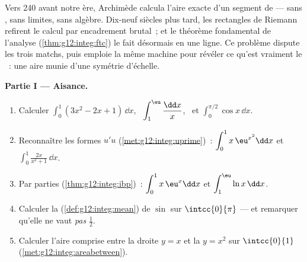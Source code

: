 \begin{problem}
\label{pb:g12:integ:1}
Vers 240 avant notre ère, Archimède calcula l'aire exacte d'un
segment de  --- sans , sans limites, sans
algèbre. Dix-neuf siècles plus tard, les rectangles de Riemann
refirent le calcul par encadrement brutal~; et le théorème
fondamental de l'analyse (\cref{thm:g12:integ:ftc}) le fait
désormais en une ligne. Ce problème dispute les trois matchs, puis
emploie la même machine pour révéler ce qu'est vraiment le
~: une aire munie d'une symétrie d'échelle.

\medskip
\noindent\textbf{Partie I --- Aisance.}
\begin{enumerate}
  \item Calculer $\displaystyle\int_0^1 (3x^2 - 2x + 1)\,\dd x$,
        \ $\displaystyle\int_1^{\eu} \frac{\dd x}{x}$, \ et
        $\displaystyle\int_0^{\pi/2} \cos x\,\dd x$.
  \item Reconnaître les formes $u'u$
        (\cref{met:g12:integ:uprime})~:
        $\displaystyle\int_0^1 x\,\eu^{x^2}\dd x$ et
        $\displaystyle\int_0^1 \frac{2x}{x^2 + 1}\,\dd x$.
  \item Par parties (\cref{thm:g12:integ:ibp})~:
        $\displaystyle\int_0^1 x\,\eu^x \dd x$ et
        $\displaystyle\int_1^{\eu} \ln x\,\dd x$.
  \item Calculer la  (\cref{def:g12:integ:mean}) de
        $\sin$ sur $\intcc{0}{\pi}$ --- et remarquer qu'elle ne vaut
        \emph{pas} $\frac12$.
  \item Calculer l'aire comprise entre la droite $y = x$ et la
         $y = x^2$ sur $\intcc{0}{1}$
        (\cref{met:g12:integ:areabetween}).
\end{enumerate}


\end{problem}
